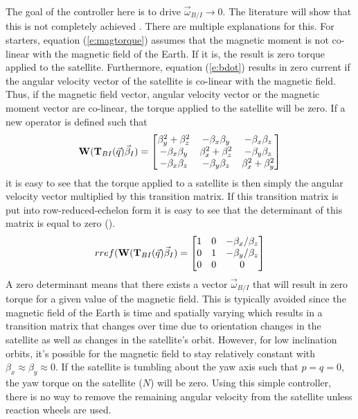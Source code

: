 \documentclass{article}
\begin{document}
The goal of the controller here is to drive
$\vec{\omega}_{B/I}\rightarrow 0$. The literature will show that
this is not completely achieved \cite{Celani}. There are multiple
explanations for this. For starters, equation (\ref{e:magtorque})
assumes that the magnetic moment is not co-linear with the magnetic
field of the Earth. If it is, the result is zero torque applied to the
satellite. Furthermore, equation (\ref{e:bdot})
results in zero current if the angular velocity vector of the
satellite is co-linear with the magnetic field. Thus, if the magnetic
field vector, angular velocity vector or the magnetic moment vector
are co-linear, the torque applied to the satellite will be zero. If a
new operator is defined such that
\begin{equation}
  {\bf W}({\bf T}_{BI}(\vec{q})\vec{\beta}_I) = \begin{bmatrix}
    \beta_y^2 + \beta_z^2 & -\beta_x\beta_y & -\beta_x\beta_z
    \\ -\beta_x\beta_y & \beta_x^2 + \beta_z^2 & -\beta_y\beta_z \\
    -\beta_x\beta_z & -\beta_y\beta_z & \beta_x^2 +
    \beta_y^2 \end{bmatrix}
\end{equation}
it is easy to see that the torque applied to a satellite is then
simply the angular velocity vector multiplied by this transition
matrix. If this transition matrix is put into row-reduced-echelon form
it is easy to see that the determinant of this matrix is equal to
zero (\cite{carlen2006linear}).
\begin{equation}
  rref({\bf W}({\bf T}_{BI}(\vec{q})\vec{\beta}_I) = \begin{bmatrix} 1 & 0
    & -\beta_x/ \beta_z \\ 0 & 1 & -\beta_y/ \beta_z \\ 0 & 0 & 0 \end{bmatrix}
\end{equation}
A zero determinant means that there exists a vector
$\vec{\omega}_{B/I}$ that will result in zero torque for a given value
of the magnetic field. This is typically avoided since the
magnetic field of the Earth is time and spatially varying
which results in a transition matrix that changes over time due to
orientation changes in the satellite as well as changes in the satellite's
orbit. However, for low inclination orbits, it's possible for the
magnetic field to stay relatively constant with $\beta_x \approx
\beta_y \approx 0$. If the satellite is tumbling about the yaw axis such
that $p=q=0$, the yaw torque on the satellite ($N$) will be
zero. Using this simple controller, there is no way to
remove the remaining angular velocity from the satellite unless
reaction wheels are used.
\end{document}
